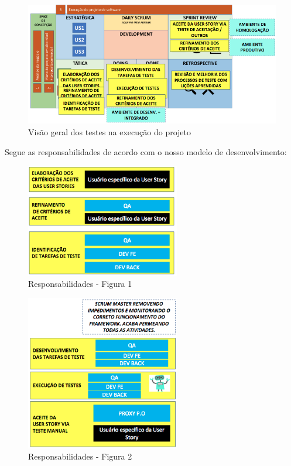 \begin{figure}[H]
  \centering
  \includegraphics[width=1\textwidth]{softwareengineer/images/model-cycle-tests} 
  \caption{Visão geral dos testes na execução do projeto}
  \label{fig:model-cycle-tests} 
\end{figure}

Segue as responsabilidades de acordo com o nosso modelo de desenvolvimento:

\begin{figure}[H]
  \centering
  \includegraphics[width=0.6\textwidth]{softwareengineer/images/responsibilities-1} 
  \caption{Responsabilidades - Figura 1}
  \label{fig:responsibilities-1} 
\end{figure}

\begin{figure}[H]
  \centering
  \includegraphics[width=0.6\textwidth]{softwareengineer/images/responsibilities-2} 
  \caption{Responsabilidades - Figura 2}
  \label{fig:responsibilities-2} 
\end{figure}

